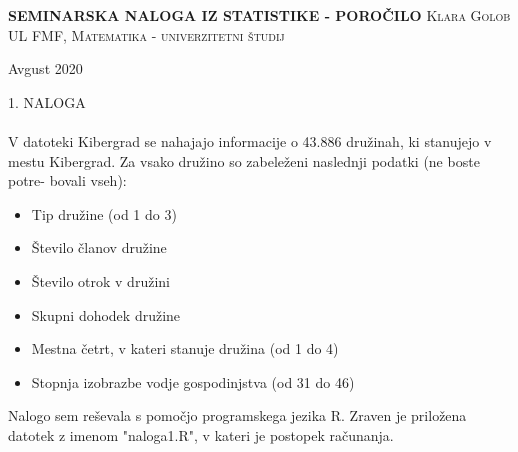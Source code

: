 \documentclass[a4paper]{article}
\begin{document}
\begin{titlepage}
    \centering
    \vfill
    \vfill
    \textbf{\large{SEMINARSKA NALOGA IZ STATISTIKE - POROČILO}}
    \vfill
    \textsc{\Large{Klara Golob}}
    \vfill\vfill
    \textsc{\large{UL FMF, Matematika - univerzitetni študij}}
    
     \vfill
    \large{Avgust 2020}
    
\end{titlepage}


\newpage


\large{1. NALOGA}
\\
\\
V datoteki Kibergrad se nahajajo informacije o 43.886 družinah, ki stanujejo v mestu Kibergrad. Za vsako družino so zabeleženi naslednji podatki (ne boste potre- bovali vseh):
\begin{itemize}
\item Tip družine (od 1 do 3)
\item Število članov družine
\item Število otrok v družini
\item Skupni dohodek družine
\item Mestna četrt, v kateri stanuje družina (od 1 do 4)
\item Stopnja izobrazbe vodje gospodinjstva (od 31 do 46)
\end{itemize}
Nalogo sem reševala s pomočjo programskega jezika R. Zraven je priložena datotek z imenom "naloga1.R", v kateri je postopek računanja.
\end{document}
